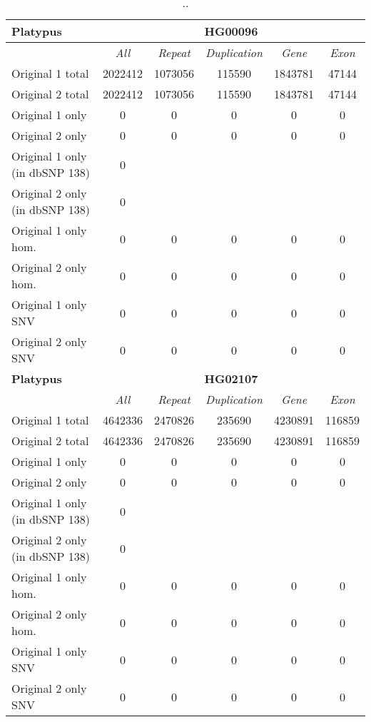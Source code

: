 \begin{table}[htb]
\caption{ .. }
\begin{center}
\begin{tabular}{|l|c||c|c|c|c|}
\hline
{\bf Platypus} & \multicolumn{5}{|c|}{\bf HG00096} \\
\hline
\cline{2-6}
{\bf} & {\it All} & {\it Repeat} & {\it Duplication} & {\it Gene} & {\it Exon} \\
\hline
Original 1 total & 2022412 & 1073056 & 115590 & 1843781 & 47144\\ 
\hline
Original 2 total & 2022412 & 1073056 & 115590 & 1843781 & 47144\\ 
\hline
Original 1 only & 0 & 0 & 0 & 0 & 0\\ 
\hline
Original 2 only & 0 & 0 & 0 & 0 & 0\\ 
\hline
Original 1 only (in dbSNP 138) & 0 &  &  &  & \\ 
\hline
Original 2 only (in dbSNP 138) & 0 &  &  &  & \\ 
\hline
Original 1 only hom. & 0 & 0 & 0 & 0 & 0\\ 
\hline
Original 2 only hom. & 0 & 0 & 0 & 0 & 0\\ 
\hline
Original 1 only SNV & 0 & 0 & 0 & 0 & 0\\ 
\hline
Original 2 only SNV & 0 & 0 & 0 & 0 & 0\\ 
\hline
\hline
{\bf Platypus} & \multicolumn{5}{|c|}{\bf HG02107} \\
\hline
\cline{2-6}
{\bf} & {\it All} & {\it Repeat} & {\it Duplication} & {\it Gene} & {\it Exon} \\
\hline
Original 1 total & 4642336 & 2470826 & 235690 & 4230891 & 116859\\ 
\hline
Original 2 total & 4642336 & 2470826 & 235690 & 4230891 & 116859\\ 
\hline
Original 1 only & 0 & 0 & 0 & 0 & 0\\ 
\hline
Original 2 only & 0 & 0 & 0 & 0 & 0\\ 
\hline
Original 1 only (in dbSNP 138) & 0 &  &  &  & \\ 
\hline
Original 2 only (in dbSNP 138) & 0 &  &  &  & \\ 
\hline
Original 1 only hom. & 0 & 0 & 0 & 0 & 0\\ 
\hline
Original 2 only hom. & 0 & 0 & 0 & 0 & 0\\ 
\hline
Original 1 only SNV & 0 & 0 & 0 & 0 & 0\\ 
\hline
Original 2 only SNV & 0 & 0 & 0 & 0 & 0\\ 
\hline
\end{tabular}
\end{center}
\label{tab:orig-vs-orig2-platypus}
\end{table}


